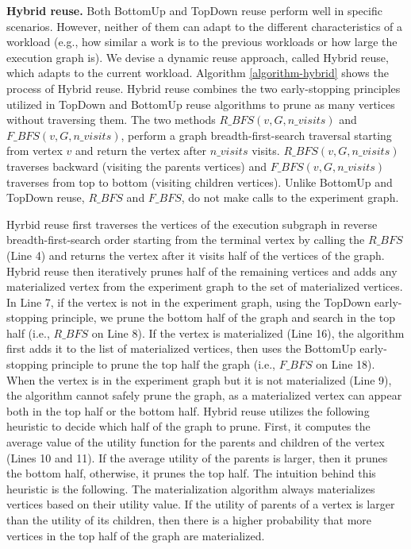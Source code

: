 {\textbf{Hybrid reuse.}
Both BottomUp and TopDown reuse perform well in specific scenarios. 
However, neither of them can adapt to the different characteristics of a workload (e.g., how similar a work is to the previous workloads or how large the execution graph is).
We devise a dynamic reuse approach, called Hybrid reuse, which adapts to the current workload.
Algorithm \ref{algorithm-hybrid} shows the process of Hybrid reuse.
Hybrid reuse combines the two early-stopping principles utilized in TopDown and BottomUp reuse algorithms to prune as many vertices without traversing them.
The two methods $R\_BFS(v, G, n\_visits)$ and $F\_BFS(v, G, n\_visits)$, perform a graph breadth-first-search traversal starting from vertex $v$ and return the vertex after $n\_visits$ visits.
$R\_BFS(v, G, n\_visits)$ traverses backward (visiting the parents vertices) and $F\_BFS(v, G, n\_visits)$ traverses from top to bottom (visiting children vertices).
Unlike BottomUp and TopDown reuse, $R\_BFS$ and $F\_BFS$, do not make calls to the experiment graph.

Hyrbid reuse first traverses the vertices of the execution subgraph in reverse breadth-first-search order starting from the terminal vertex by calling the $R\_BFS$ (Line 4) and returns the vertex after it visits half of the vertices of the graph.
Hybrid reuse then iteratively prunes half of the remaining vertices and adds any materialized vertex from the experiment graph to the set of materialized vertices.
In Line 7, if the vertex is not in the experiment graph, using the TopDown early-stopping principle, we prune the bottom half of the graph and search in the top half (i.e., $R\_BFS$ on Line 8).
If the vertex is materialized (Line 16), the algorithm first adds it to the list of materialized vertices, then uses the BottomUp early-stopping principle to prune the top half the graph (i.e., $F\_BFS$ on Line 18).
When the vertex is in the experiment graph but it is not materialized (Line 9), the algorithm cannot safely prune the graph, as a materialized vertex can appear both in the top half or the bottom half.
Hybrid reuse utilizes the following heuristic to decide which half of the graph to prune.
First, it computes the average value of the utility function for the parents and children of the vertex (Lines 10 and 11).
If the average utility of the parents is larger, then it prunes the bottom half, otherwise, it prunes the top half.
The intuition behind this heuristic is the following.
The materialization algorithm always materializes vertices based on their utility value.
If the utility of parents of a vertex is larger than the utility of its children, then there is a higher probability that more vertices in the top half of the graph are materialized.


}
